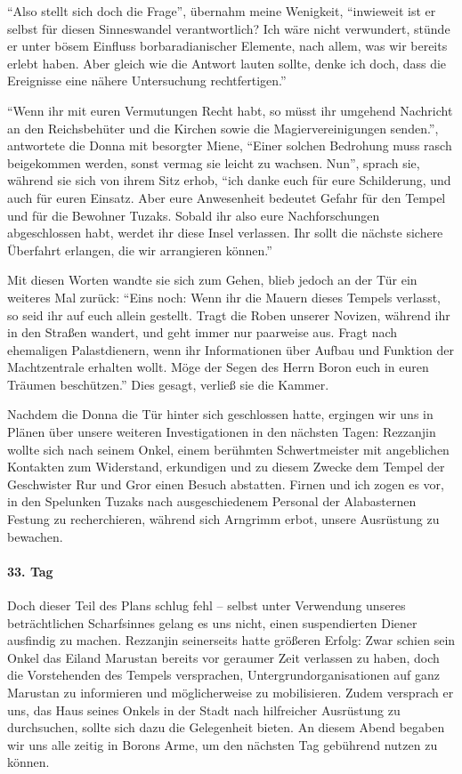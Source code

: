 ``Also stellt sich doch die Frage'', übernahm meine Wenigkeit, ``inwieweit ist er selbst für diesen Sinneswandel verantwortlich? Ich wäre nicht verwundert, stünde er unter bösem Einfluss borbaradianischer Elemente, nach allem, was wir bereits erlebt haben. Aber gleich wie die Antwort lauten sollte, denke ich doch, dass die Ereignisse eine nähere Untersuchung rechtfertigen.''

``Wenn ihr mit euren Vermutungen Recht habt, so müsst ihr umgehend Nachricht an den Reichsbehüter und die Kirchen sowie die Magiervereinigungen senden.'', antwortete die Donna mit besorgter Miene, ``Einer solchen Bedrohung muss rasch beigekommen werden, sonst vermag sie leicht zu wachsen. Nun'', sprach sie, während sie sich von ihrem Sitz erhob, ``ich danke euch für eure Schilderung, und auch für euren Einsatz. Aber eure Anwesenheit bedeutet Gefahr für den Tempel und für die Bewohner Tuzaks. Sobald ihr also eure Nachforschungen abgeschlossen habt, werdet ihr diese Insel verlassen. Ihr sollt die nächste sichere Überfahrt erlangen, die wir arrangieren können.''

Mit diesen Worten wandte sie sich zum Gehen, blieb jedoch an der Tür ein weiteres Mal zurück: ``Eins noch: Wenn ihr die Mauern dieses Tempels verlasst, so seid ihr auf euch allein gestellt. Tragt die Roben unserer Novizen, während ihr in den Straßen wandert, und geht immer nur paarweise aus. Fragt nach ehemaligen Palastdienern, wenn ihr Informationen über Aufbau und Funktion der Machtzentrale erhalten wollt. Möge der Segen des Herrn Boron euch in euren Träumen beschützen.'' Dies gesagt, verließ sie die Kammer.

Nachdem die Donna die Tür hinter sich geschlossen hatte, ergingen wir uns in Plänen über unsere weiteren Investigationen in den nächsten Tagen: Rezzanjin wollte sich nach seinem Onkel, einem berühmten Schwertmeister mit angeblichen Kontakten zum Widerstand, erkundigen und zu diesem Zwecke dem Tempel der Geschwister Rur und Gror einen Besuch abstatten. Firnen und ich zogen es vor, in den Spelunken Tuzaks nach ausgeschiedenem Personal der Alabasternen Festung zu recherchieren, während sich Arngrimm erbot, unsere Ausrüstung zu bewachen.

\paragraph{33. Tag}
Doch dieser Teil des Plans schlug fehl -- selbst unter Verwendung unseres beträchtlichen Scharfsinnes gelang es uns nicht, einen suspendierten Diener ausfindig zu machen. Rezzanjin seinerseits hatte größeren Erfolg: Zwar schien sein Onkel das Eiland Marustan bereits vor geraumer Zeit verlassen zu haben, doch die Vorstehenden des Tempels versprachen, Untergrundorganisationen auf ganz Marustan zu informieren und möglicherweise zu mobilisieren. Zudem versprach er uns, das Haus seines Onkels in der Stadt nach hilfreicher Ausrüstung zu durchsuchen, sollte sich dazu die Gelegenheit bieten. An diesem Abend begaben wir uns alle zeitig in Borons Arme, um den nächsten Tag gebührend nutzen zu können.

